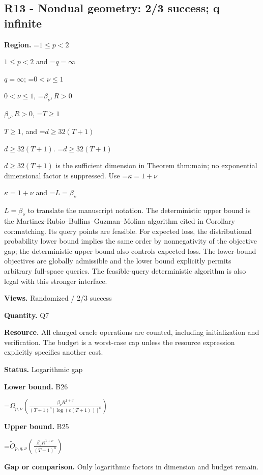 \documentclass[10pt,a4paper]{article}
\newcommand{\AtlasMath}[1]{\par\begingroup\centering\setbox0=\hbox{$\displaystyle #1$}\ifdim\wd0>1.4\linewidth\typeout{ATLAS WIDE FORMULA: \the\wd0}\fi\ifdim\wd0>\linewidth\resizebox{\linewidth}{!}{\box0}\else\box0\fi\par\endgroup}
\newcommand{\AtlasInlineMath}[1]{\begingroup\setbox0=\hbox{$#1$}\ifdim\wd0>.4\linewidth\endgroup\AtlasMath{#1}\else\endgroup$#1$\fi}
\begin{document}
\subsection{R13 - Nondual geometry: 2/3 success; q infinite}


\textbf{Region.} \AtlasInlineMath{1\le p<2} and \AtlasInlineMath{q=\infty}; \AtlasInlineMath{0<\nu\le1}, \AtlasInlineMath{\beta_\nu,R>0}, \AtlasInlineMath{T\ge1}, and \AtlasInlineMath{d\ge32(T+1)}. \AtlasInlineMath{d\ge32(T+1)} is the sufficient dimension in Theorem thm:main; no exponential dimensional factor is suppressed. Use \AtlasInlineMath{\kappa=1+\nu} and \AtlasInlineMath{L=\beta_\nu} to translate the manuscript notation. The deterministic upper bound is the Martinez-Rubio--Bullins--Guzman--Molina algorithm cited in Corollary cor:matching. Its query points are feasible. For expected loss, the distributional probability lower bound implies the same order by nonnegativity of the objective gap; the deterministic upper bound also controls expected loss. The lower-bound objectives are globally admissible and the lower bound explicitly permits arbitrary full-space queries. The feasible-query deterministic algorithm is also legal with this stronger interface.



\textbf{Views.} Randomized / 2/3 success



\textbf{Quantity.} Q7



\textbf{Resource.} All charged oracle operations are counted, including initialization and verification. The budget is a worst-case cap unless the resource expression explicitly specifies another cost.



\textbf{Status.} Logarithmic gap



\textbf{Lower bound.} B26



\AtlasMath{\Omega_{p,\nu}\!\left(\frac{\beta_\nu R^{1+\nu}}{(T+1)^a[\log(e(T+1))]^\nu}\right)}


\textbf{Upper bound.} B25



\AtlasMath{\widetilde O_{p,q,\nu}\!\left(\frac{\beta_\nu R^{1+\nu}}{(T+1)^a}\right)}


\textbf{Gap or comparison.} Only logarithmic factors in dimension and budget remain.
\end{document}
